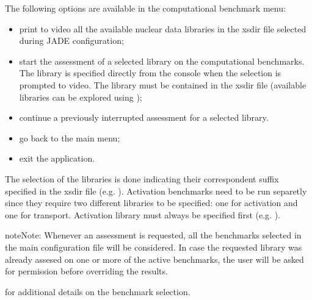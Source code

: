 \documentclass[letterpaper,10pt,english]{sphinxmanual}
\begin{document}
The following options are available in the computational benchmark menu:
\begin{itemize}
\item {} 
 print to video all the available nuclear data libraries
in the xsdir file selected during JADE configuration;

\item {} 
 start the assessment of a selected library on the computational benchmarks. The library is
specified directly from the console when the selection is prompted to
video. The library must be contained in the xsdir file (available libraries
can be explored using );

\item {} 
 continue a previously interrupted assessment for a selected
library. 

\item {} 
 go back to the main menu;

\item {} 
 exit the application.

\end{itemize}

The selection of the libraries is done indicating their correspondent suffix specified in the xsdir file
(e.g. ). Activation benchmarks need to be run separetly since they require two different libraries
to be specified: one for activation and one for transport. Activation library must always be specified
first (e.g. ).

\begin{sphinxadmonition}{note}{Note:}
Whenever an assessment is requested, all the benchmarks selected in the main configuration file will be considered.
In case the requested library was already assesed on one or more of the active benchmarks,
the user will be asked for permission before overriding the results.
\end{sphinxadmonition}




{\hyperref[\detokenize{usage/configuration:config}]{}} for additional details on the benchmark selection.
\end{document}
